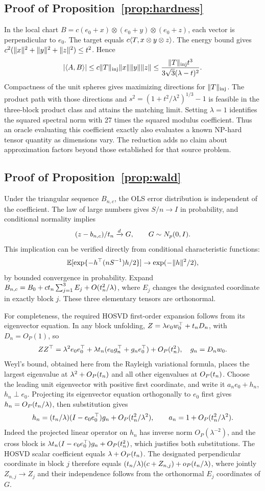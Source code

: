 \subsection{Proof of Proposition~\ref{prop:hardness}}
In the local chart $B=c(e_0+x)\otimes(e_0+y)\otimes(e_0+z)$, each vector is perpendicular to $e_0$. The target equals $c\langle T,x\otimes y\otimes z\rangle$. The energy bound gives $c^2(\lVert x\rVert^2+\lVert y\rVert^2+\lVert z\rVert^2)\le t^2$. Hence
\[
 |\langle A,B\rangle|\le c\lVert T\rVert_{\rm inj}\lVert x\rVert\lVert y\rVert\lVert z\rVert
 \le\frac{\lVert T\rVert_{\rm inj}t^3}{3\sqrt3(\lambda-t)^2}.
\]
Compactness of the unit spheres gives maximizing directions for $\lVert T\rVert_{\rm inj}$. The product path with those directions and $s^2=(1+t^2/\lambda^2)^{1/3}-1$ is feasible in the three-block product class and attains the matching limit. Setting $\lambda=1$ identifies the squared spectral norm with 27 times the squared modulus coefficient. Thus an oracle evaluating this coefficient exactly also evaluates a known NP-hard tensor quantity as dimensions vary. The reduction adds no claim about approximation factors beyond those established for that source problem.

\subsection{Proof of Proposition~\ref{prop:wald}}
Under the triangular sequence $B_{n,c}$, the OLS error distribution is independent of the coefficient. The law of large numbers gives $S/n\to I$ in probability, and conditional normality implies
\[
 (z-b_{n,c})/t_n\xrightarrow{d}G,\qquad G\sim N_p(0,I).
\]
This implication can be verified directly from conditional characteristic functions:
\[
 \mathbb E[\exp\{-h^\top(nS^{-1})h/2\}]\to\exp(-\lVert h\rVert^2/2),
\]
by bounded convergence in probability. Expand $B_{n,c}=B_0+ct_n\sum_{j=1}^3 E_j+O(t_n^2/\lambda)$, where $E_j$ changes the designated coordinate in exactly block $j$. These three elementary tensors are orthonormal.

For completeness, the required HOSVD first-order expansion follows from its eigenvector equation. In any block unfolding, $Z=\lambda e_0w_0^\top+t_n D_n$, with $D_n=O_P(1)$, so
\[
 ZZ^\top=\lambda^2e_0e_0^\top+
 \lambda t_n(e_0g_n^\top+g_ne_0^\top)+O_P(t_n^2),\quad g_n=D_nw_0.
\]
Weyl's bound, obtained here from the Rayleigh variational formula, places the largest eigenvalue at $\lambda^2+O_P(t_n)$ and all other eigenvalues at $O_P(t_n)$. Choose the leading unit eigenvector with positive first coordinate, and write it $a_ne_0+h_n$, $h_n\perp e_0$. Projecting its eigenvector equation orthogonally to $e_0$ first gives $h_n=O_P(t_n/\lambda)$, then substitution gives
\[
 h_n=(t_n/\lambda)(I-e_0e_0^\top)g_n+O_P(t_n^2/\lambda^2),
 \qquad a_n=1+O_P(t_n^2/\lambda^2).
\]
Indeed the projected linear operator on $h_n$ has inverse norm $O_P(\lambda^{-2})$, and the cross block is $\lambda t_n(I-e_0e_0^\top)g_n+O_P(t_n^2)$, which justifies both substitutions. The HOSVD scalar coefficient equals $\lambda+O_P(t_n)$. The designated perpendicular coordinate in block $j$ therefore equals $(t_n/\lambda)(c+Z_{n,j})+o_P(t_n/\lambda)$, where jointly $Z_{n,j}\to Z_j$ and their independence follows from the orthonormal $E_j$ coordinates of $G$.

